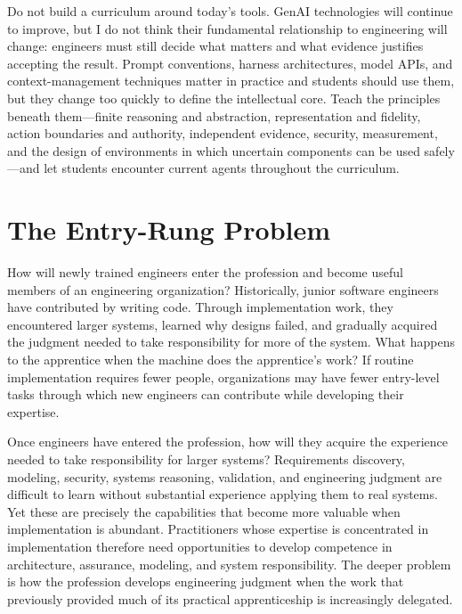 
Do not build a curriculum around today's tools. GenAI technologies will continue to improve, but I do not think their fundamental relationship to engineering will change: engineers must still decide what matters and what evidence justifies accepting the result. Prompt conventions, harness architectures, model APIs, and context-management techniques matter in practice and students should use them, but they change too quickly to define the intellectual core. Teach the principles beneath them---finite reasoning and abstraction, representation and fidelity, action boundaries and authority, independent evidence, security, measurement, and the design of environments in which uncertain components can be used safely---and let students encounter current agents throughout the curriculum.

\section{The Entry-Rung Problem}\label{heading:the-entry-rung-problem}


How will newly trained engineers enter the profession and become useful members of an engineering organization? Historically, junior software engineers have contributed by writing code. Through implementation work, they encountered larger systems, learned why designs failed, and gradually acquired the judgment needed to take responsibility for more of the system. What happens to the apprentice when the machine does the apprentice's work? If routine implementation requires fewer people, organizations may have fewer entry-level tasks through which new engineers can contribute while developing their expertise.


Once engineers have entered the profession, how will they acquire the experience needed to take responsibility for larger systems? Requirements discovery, modeling, security, systems reasoning, validation, and engineering judgment are difficult to learn without substantial experience applying them to real systems. Yet these are precisely the capabilities that become more valuable when implementation is abundant. Practitioners whose expertise is concentrated in implementation therefore need opportunities to develop competence in architecture, assurance, modeling, and system responsibility. The deeper problem is how the profession develops engineering judgment when the work that previously provided much of its practical apprenticeship is increasingly delegated.

